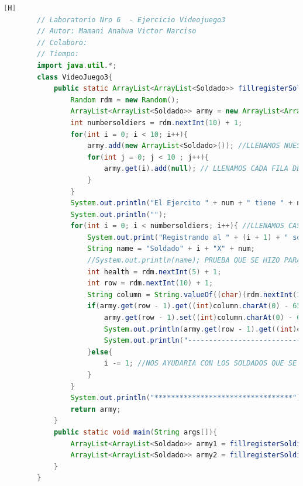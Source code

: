 \documentclass{article}
\begin{document}
	\begin{lstlisting}[language=java,caption={Las lineas de codigos del metodo creado:}][H]
		// Laboratorio Nro 6  - Ejercicio Videojuego3
		// Autor: Mamani Anahua Victor Narciso
		// Colaboro:
		// Tiempo:
		import java.util.*;
		class VideoJuego3{
			public static ArrayList<ArrayList<Soldado>> fillregisterSoldiers(int num){
				Random rdm = new Random();
				ArrayList<ArrayList<Soldado>> army = new ArrayList<ArrayList<Soldado>>();
				int numbersoldiers = rdm.nextInt(10) + 1;
				for(int i = 0; i < 10; i++){
					army.add(new ArrayList<Soldado>()); //LLENAMOS NUESTROS ARRAYLIST BIDIMENSIONAL CON CADA FILA PARA QUE CUMPLAN CON ESTRUCTURA DEL TABLERO
					for(int j = 0; j < 10 ; j++){
						army.get(i).add(null); // LLENAMOS CADA FILA DEL ARRAYLIST CON UN OBJETO SOLDADO CON TAL QUE ESTE SEA NULL PARA QUE SEPA QUE ESTE TIENE UNA CASILLA PERO NO HAY NADIE TODAVIA SE PUEDE LLENAR 
					}
				}
				System.out.println("El Ejercito " + num + " tiene " + numbersoldiers + " soldados : " ); 
				System.out.println("");
				for(int i = 0; i < numbersoldiers; i++){ //LLENAMOS CASILLAS CON CADA SOLDADO CREADO ALEATORIAMENTE
					System.out.print("Registrando al " + (i + 1) + " soldado del Ejercito " + num + "");
					String name = "Soldado" + i + "X" + num;
					//System.out.println(name); PRUEBA QUE SE HIZO PARA VER LOS NOMBRES
					int health = rdm.nextInt(5) + 1;
					int row = rdm.nextInt(10) + 1;
					String column = String.valueOf((char)(rdm.nextInt(10) + 65)); //REUTILIZAMOS CODIGO DEL ANTERIOR ARCHIVO VIDEOJUEGO2.JAVA YA QUE TENDRIAN LA MISMA FUNCIONALIDAD
					if(army.get(row - 1).get((int)column.charAt(0) - 65) == null){
						army.get(row - 1).set((int)column.charAt(0) - 65, new Soldado(name, health, row, column));
						System.out.println(army.get(row - 1).get((int)column.charAt(0) - 65).toString());
						System.out.println("---------------------------------");
					}else{
						i -= 1; //NOS AYUDARIA CON LOS SOLDADOS QUE SE REPITEN EN EL MISMO CASILLERO CON TAL QUE NO DEBERIA CONTAR 
					}
				}
				System.out.println("*********************************");
				return army;
			}
			public static void main(String args[]){
				ArrayList<ArrayList<Soldado>> army1 = fillregisterSoldiers(1);
				ArrayList<ArrayList<Soldado>> army2 = fillregisterSoldiers(2);
			}
		}
		
	\end{lstlisting}
\end{document}
